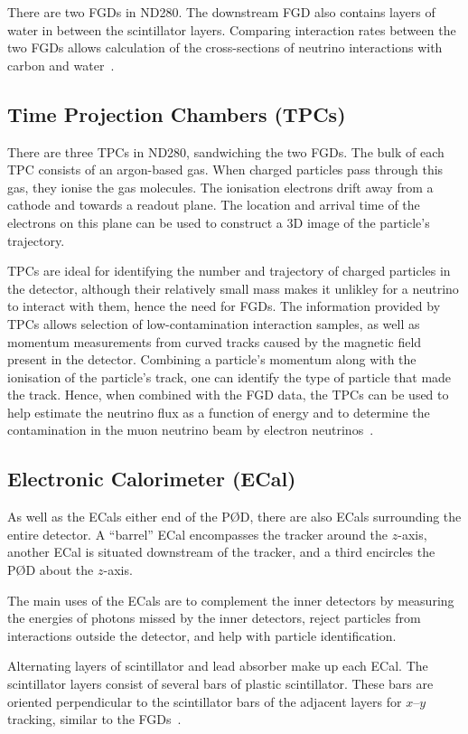 \documentclass[aps,pra,12pt,notitlepage,tightenlines]{revtex4-1}
\begin{document}
There are two FGDs in ND280. The downstream FGD also contains layers of water in between the scintillator layers. Comparing interaction rates between the two FGDs allows calculation of the cross-sections of neutrino interactions with carbon and water~\cite{ABE2011106, Amaudruz:2012agx}.

\subsection{Time Projection Chambers (TPCs)}
There are three TPCs in ND280, sandwiching the two FGDs. The bulk of each TPC consists of an argon-based gas. When charged particles pass through this gas, they ionise the gas molecules. The ionisation electrons drift away from a cathode and towards a readout plane. The location and arrival time of the electrons on this plane can be used to construct a 3D image of the particle's trajectory.

TPCs are ideal for identifying the number and trajectory of charged particles in the detector, although their relatively small mass makes it unlikley for a neutrino to interact with them, hence the need for FGDs. The information provided by TPCs allows selection of low-contamination interaction samples, as well as momentum measurements from curved tracks caused by the magnetic field present in the detector. Combining a particle's momentum along with the ionisation of the particle's track, one can identify the type of particle that made the track. Hence, when combined with the FGD data, the TPCs can be used to help estimate the neutrino flux as a function of energy and to determine the contamination in the muon neutrino beam by electron neutrinos~\cite{ABE2011106, Abgrall:2010hi}.

\subsection{Electronic Calorimeter (ECal)}
As well as the ECals either end of the P\O D, there are also ECals surrounding the entire detector. A ``barrel'' ECal encompasses the tracker around the $z$-axis, another ECal is situated downstream of the tracker, and a third encircles the P\O D about the $z$-axis. 

The main uses of the ECals are to complement the inner detectors by measuring the energies of photons missed by the inner detectors, reject particles from interactions outside the detector, and help with particle identification.

Alternating layers of scintillator and lead absorber make up each ECal. The scintillator layers consist of several bars of plastic scintillator. These bars are oriented perpendicular to the scintillator bars of the adjacent layers for $x$--$y$ tracking, similar to the FGDs~\cite{ABE2011106}.
\end{document}
